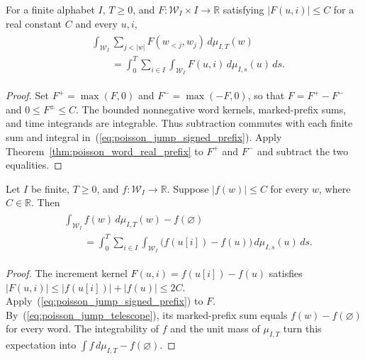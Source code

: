 \begin{theorem}
\label{thm:poisson_word_signed_prefix}
\leanok
{}
For a finite alphabet $I$, $T\geq0$, and
$F:\mathcal W_I\times I\to\mathbb R$ satisfying $|F(u,i)|\leq C$
for a real constant $C$ and every $u,i$,
\begin{align}
 \begin{aligned}
 &\int_{\mathcal W_I}\sum_{j<|w|}F(w_{<j},w_j)\,d\mu_{I,T}(w)
 \\
 &\qquad=\int_0^T\sum_{i\in I}\int_{\mathcal W_I}
 F(u,i)\,d\mu_{I,s}(u)\,ds.
 \end{aligned}
 \label{eq:poisson_jump_signed_prefix}
\end{align}
\end{theorem}
\begin{proof}
\leanok
{}
Set $F^+=\max(F,0)$ and $F^-=\max(-F,0)$, so that
$F=F^+-F^-$ and $0\leq F^\pm\leq C$.
The bounded nonnegative word kernels, marked-prefix sums, and time
integrands are integrable.  Thus subtraction commutes with each
finite sum and integral in~(\ref{eq:poisson_jump_signed_prefix}).
Apply Theorem~\ref{thm:poisson_word_real_prefix} to $F^+$ and $F^-$
and subtract the two equalities.
\end{proof}

\begin{theorem}
\label{thm:poisson_word_jump}
\leanok
{}
Let $I$ be finite, $T\geq0$, and $f:\mathcal W_I\to\mathbb R$.
Suppose $|f(w)|\leq C$ for every $w$, where $C\in\mathbb R$.
Then
\begin{align}
 \begin{aligned}
 &\int_{\mathcal W_I}f(w)\,d\mu_{I,T}(w)-f(\varnothing)
 \\
 &\qquad=\int_0^T\sum_{i\in I}\int_{\mathcal W_I}
 \bigl(f(u[i])-f(u)\bigr)\,d\mu_{I,s}(u)\,ds.
 \end{aligned}
 \label{eq:poisson_jump_formula}
\end{align}
\end{theorem}
\begin{proof}
\leanok
{}
The increment kernel $F(u,i)=f(u[i])-f(u)$ satisfies
$|F(u,i)|\leq|f(u[i])|+|f(u)|\leq2C$.
Apply~(\ref{eq:poisson_jump_signed_prefix}) to $F$.
By~(\ref{eq:poisson_jump_telescope}), its marked-prefix sum equals
$f(w)-f(\varnothing)$ for every word.  The integrability of $f$ and
the unit mass of $\mu_{I,T}$ turn this expectation into
$\int f\,d\mu_{I,T}-f(\varnothing)$.
\end{proof}

